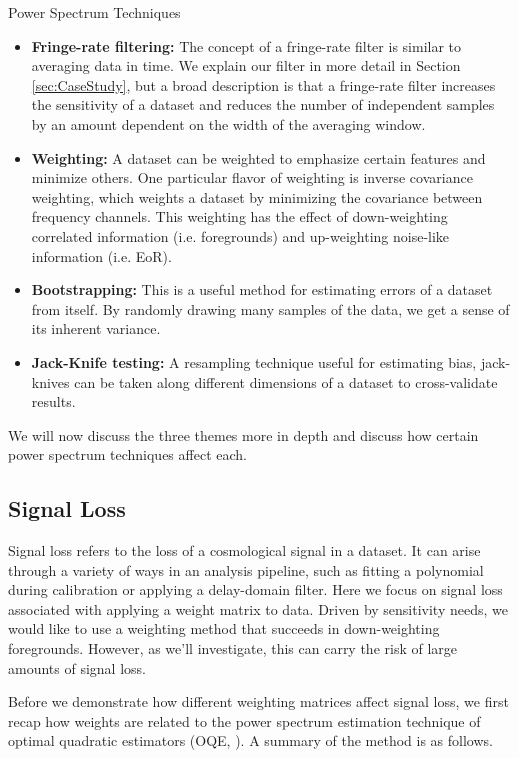 \documentclass[preprint2,numberedappendix,tighten,twocolappendix]{aastex6}  %
\begin{document}
\begin{center}
Power Spectrum Techniques
\end{center}
\begin{itemize}
\item \textbf{Fringe-rate filtering:} The concept of a fringe-rate filter is similar to averaging data in time. We explain our filter in more detail in Section \ref{sec:CaseStudy}, but a broad description is that a fringe-rate filter increases the sensitivity of a dataset and reduces the number of independent samples by an amount dependent on the width of the averaging window.
\item \textbf{Weighting:} A dataset can be weighted to emphasize certain features and minimize others. One particular flavor of weighting is inverse covariance weighting, which weights a dataset by minimizing the covariance between frequency channels. This weighting has the effect of down-weighting correlated information (i.e. foregrounds) and up-weighting noise-like information (i.e. EoR).
\item \textbf{Bootstrapping:} This is a useful method for estimating errors of a dataset from itself. By randomly drawing many samples of the data, we get a sense of its inherent variance.
\item \textbf{Jack-Knife testing:} A resampling technique useful for estimating bias, jack-knives can be taken along different dimensions of a dataset to cross-validate results.
\end{itemize}

We will now discuss the three themes more in depth and discuss how certain power spectrum techniques affect each.

\subsection{Signal Loss}
\label{sec:SiglossOverview}

Signal loss refers to the loss of a cosmological signal in a dataset. It can arise through a variety of ways in an analysis pipeline, such as fitting a polynomial during calibration or applying a delay-domain filter. Here we focus on signal loss associated with applying a weight matrix to data. Driven by sensitivity needs, we would like to use a weighting method that succeeds in down-weighting foregrounds. However, as we'll investigate, this can carry the risk of large amounts of signal loss. 

Before we demonstrate how different weighting matrices affect signal loss, we first recap how weights are related to the power spectrum estimation technique of optimal quadratic estimators (OQE, \citealt{liu_et_al2014b}). A summary of the method is as follows. 
\end{document}
